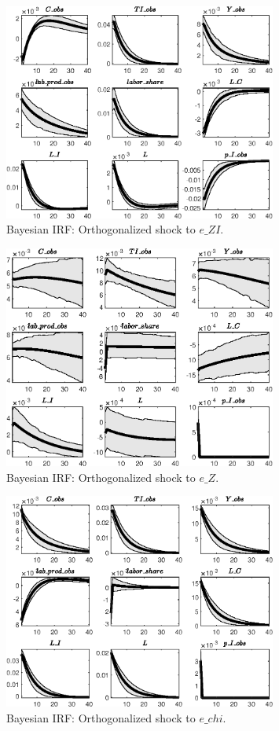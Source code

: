 
\begin{figure}[H]
\centering 
\includegraphics[width=0.80\textwidth]{two_sector_RBC_fixed_cost/Output/two_sector_RBC_fixed_cost_Bayesian_IRF_e_ZI_1}
\caption{Bayesian IRF: Orthogonalized shock to $e\_ZI$.}
\label{Fig:BayesianIRF:e_ZI:1}
\end{figure}
 
\begin{figure}[H]
\centering 
\includegraphics[width=0.80\textwidth]{two_sector_RBC_fixed_cost/Output/two_sector_RBC_fixed_cost_Bayesian_IRF_e_Z_1}
\caption{Bayesian IRF: Orthogonalized shock to $e\_Z$.}
\label{Fig:BayesianIRF:e_Z:1}
\end{figure}
 
\begin{figure}[H]
\centering 
\includegraphics[width=0.80\textwidth]{two_sector_RBC_fixed_cost/Output/two_sector_RBC_fixed_cost_Bayesian_IRF_e_chi_1}
\caption{Bayesian IRF: Orthogonalized shock to $e\_chi$.}
\label{Fig:BayesianIRF:e_chi:1}
\end{figure}
 
